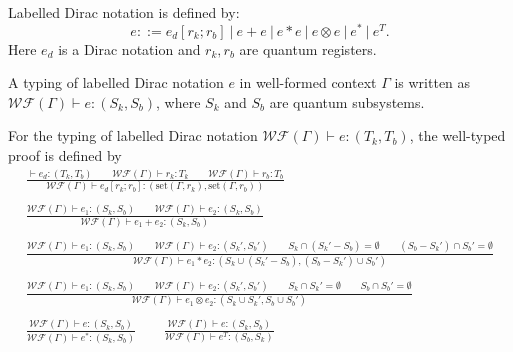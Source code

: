 \begin{definition}
    Labelled Dirac notation is defined by:
    $$
    e ::= e_d [r_k; r_b]\ |\ e + e\ |\ e * e\ |\ e \otimes e\ |\ e^*\ |\ e^T.
    $$
    Here $e_d$ is a Dirac notation and $r_k, r_b$ are quantum registers.
\end{definition}

\begin{definition}
  A typing of labelled Dirac notation $e$ in well-formed context $\Gamma$ is written as $\mathcal{WF}(\Gamma) \vdash e : (S_k, S_b)$, where $S_k$ and $S_b$ are quantum subsystems. 
\end{definition}

\begin{definition}
  For the typing of labelled Dirac notation $\mathcal{WF}(\Gamma) \vdash e : (T_k, T_b)$, the well-typed proof is defined by
  \begin{gather*}
    \frac{\vdash e_d : (T_k, T_b) \qquad \mathcal{WF}(\Gamma) \vdash r_k : T_k \qquad \mathcal{WF}(\Gamma) \vdash r_b : T_b}{\mathcal{WF}(\Gamma) \vdash e_d[r_k; r_b] : (\mathrm{set}(\Gamma, r_k), \mathrm{set}(\Gamma, r_b))}\\
    \ \\
    \frac{\mathcal{WF}(\Gamma) \vdash e_1 : (S_k, S_b) \qquad \mathcal{WF}(\Gamma) \vdash e_2 : (S_k, S_b)}{\mathcal{WF}(\Gamma) \vdash e_1 + e_2 : (S_k, S_b)}\\
    \ \\
    \frac{\mathcal{WF}(\Gamma) \vdash e_1 : (S_k, S_b) \qquad \mathcal{WF}(\Gamma) \vdash e_2 : (S_k', S_b')
    \qquad S_k \cap (S_k' - S_b) = \emptyset
    \qquad (S_b - S_k') \cap S_b' = \emptyset}
    {\mathcal{WF}(\Gamma) \vdash e_1 * e_2 : (S_k \cup (S_k' - S_b), (S_b - S_k') \cup S_b')}\\
    \ \\
    \frac{\mathcal{WF}(\Gamma) \vdash e_1 : (S_k, S_b) \qquad \mathcal{WF}(\Gamma) \vdash e_2 : (S_k', S_b')
    \qquad S_k \cap S_k' = \emptyset
    \qquad S_b \cap S_b' = \emptyset}
    {\mathcal{WF}(\Gamma) \vdash e_1 \otimes e_2 : (S_k \cup S_k', S_b \cup S_b')}\\
    \ \\
    \frac{\mathcal{WF}(\Gamma) \vdash e : (S_k, S_b)}{\mathcal{WF}(\Gamma) \vdash e^* : (S_k, S_b)}
    \qquad
    \frac{\mathcal{WF}(\Gamma) \vdash e : (S_k, S_b)}{\mathcal{WF}(\Gamma) \vdash e^T : (S_b, S_k)}
  \end{gather*}
\end{definition}

